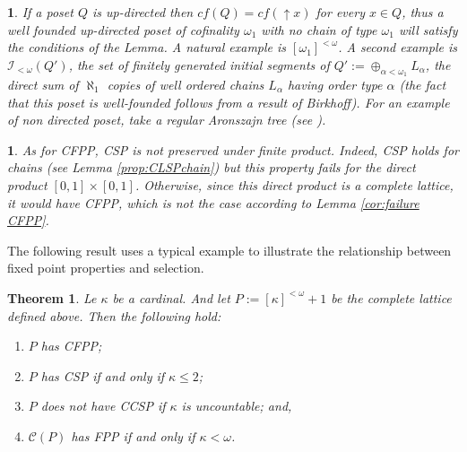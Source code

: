 \documentclass[12pt]{amsart}
\newtheorem{theorem}[definition]{{\bf Theorem}}
\newtheorem{example}[definition]{\noindent {\bf Example}}
\newtheorem{remark}[definition]{\noindent {\bf Remark}}\newtheorem{problem}[definition]{\noindent {\bf Problem}}
\begin{document}
\begin{example} 
If a poset $Q$ is up-directed then $cf(Q)=cf({\uparrow \!\!} x)$ for
every $x\in Q$, thus a well founded up-directed poset of cofinality
$\omega_1$ with no chain of type $\omega_1$ will satisfy the
conditions of the Lemma. A natural example is $ [\omega_1]^{<\omega}$.
A second example is $\mathcal I_{<\omega}(Q')$, the set of finitely
generated initial segments of $Q':=\oplus_{\alpha<\omega_1}
L_{\alpha}$, the direct sum of $\aleph_1$ copies of well ordered
chains $L_{\alpha}$ having order type $\alpha$ (the fact that this
poset is well-founded follows from a result of Birkhoff). For an
example of non directed poset, take a regular Aronszajn tree (see
\cite{jech}).\\
\end{example}
 
\begin{remark}
As for CFPP, CSP is not preserved under finite product. Indeed, CSP
holds for chains (see Lemma \ref{prop:CLSPchain}) but this property
fails for the direct product $[0, 1]\times [0,1]$. Otherwise, since
this direct product is a complete lattice, it would have CFPP, which
is not the case according to Lemma \ref{cor:failure CFPP}.\\
\end{remark}

The following result uses a typical example to illustrate the relationship
between fixed  point properties and selection.

\begin{theorem}\label{thm:illus} 
Le $\kappa$ be a cardinal. And let
$P:=[\kappa]^{<\omega}+1$ be the complete lattice defined above.  Then the following hold:\\
[-.2cm]
\begin{enumerate}[{(i)}]
\item  $P$ has  CFPP;\\[-.2cm] 
\item  $P$ has  CSP if and only if $\kappa\leq 2$;\\[-.2cm]
\item  $P$ does not have CCSP if $\kappa$ is uncountable; and,\\[-.2cm]
\item  $\mathcal C (P)$ has FPP if and only if $\kappa<\omega$.\\[-.2cm] 
\end{enumerate} 
\end{theorem}
\end{document}
